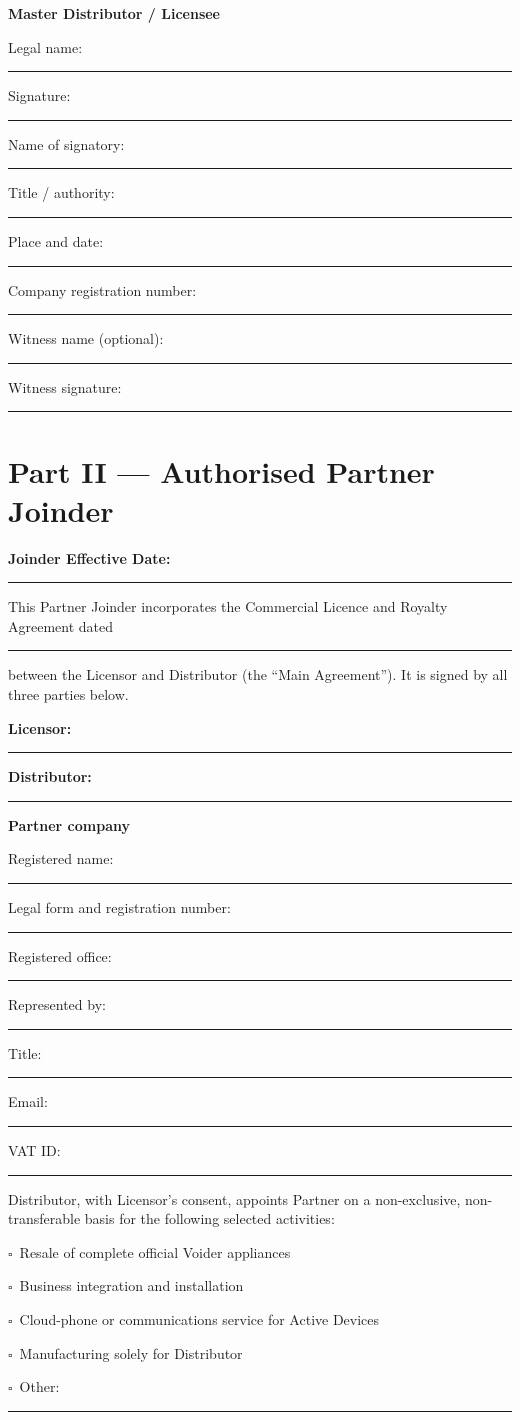 \documentclass[11pt,a4paper]{article}
\newcommand{\blank}[1]{\rule{#1}{0.45pt}}
\newcommand{\checkbox}{\(\square\)}
\newcommand{\sigblock}[1]{%
  \vspace{4mm}
  {\large\bfseries #1}\par\medskip
  Legal name: \blank{0.72\linewidth}\par\vspace{5mm}
  Signature: \blank{0.73\linewidth}\par\vspace{5mm}
  Name of signatory: \blank{0.65\linewidth}\par\vspace{5mm}
  Title / authority: \blank{0.67\linewidth}\par\vspace{5mm}
  Place and date: \blank{0.69\linewidth}\par
}
\newcommand{\articleheading}[2]{%
  \par\medskip{\large\bfseries\color{voiderblue}#1\quad #2}\par\smallskip
}
\begin{document}
\newpage
\sigblock{Master Distributor / Licensee}

Company registration number: \blank{88mm}\par\vspace{5mm}

\vfill
Witness name (optional): \blank{50mm}\quad Witness signature: \blank{36mm}\par

\newpage
\part*{Part II --- Authorised Partner Joinder}

\textbf{Joinder Effective Date:} \blank{50mm}

This Partner Joinder incorporates the Commercial Licence and Royalty Agreement dated \blank{40mm} between the Licensor and Distributor (the ``Main Agreement''). It is signed by all three parties below.

\textbf{Licensor:} \blank{125mm}\par
\textbf{Distributor:} \blank{117mm}\par

\textbf{Partner company}

Registered name: \blank{116mm}\par
Legal form and registration number: \blank{87mm}\par
Registered office: \blank{119mm}\par
Represented by: \blank{61mm}\quad Title: \blank{49mm}\par
Email: \blank{65mm}\quad VAT ID: \blank{54mm}\par

\articleheading{1.}{Appointment}

Distributor, with Licensor's consent, appoints Partner on a non-exclusive, non-transferable basis for the following selected activities:

\checkbox\ Resale of complete official Voider appliances\par
\checkbox\ Business integration and installation\par
\checkbox\ Cloud-phone or communications service for Active Devices\par
\checkbox\ Manufacturing solely for Distributor\par
\checkbox\ Other: \blank{119mm}\par
\end{document}
